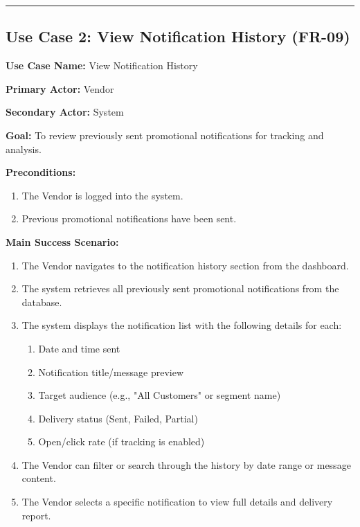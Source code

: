 \vspace{0.5cm}
\hrule
\vspace{0.5cm}

\subsection*{Use Case 2: View Notification History (FR-09)}

\textbf{Use Case Name:} View Notification History

\textbf{Primary Actor:} Vendor

\textbf{Secondary Actor:} System

\textbf{Goal:} To review previously sent promotional notifications for tracking and analysis.

\textbf{Preconditions:}
\begin{enumerate}
    \item The Vendor is logged into the system.
    \item Previous promotional notifications have been sent.
\end{enumerate}

\textbf{Main Success Scenario:}
\begin{enumerate}
    \item The Vendor navigates to the notification history section from the dashboard.
    \item The system retrieves all previously sent promotional notifications from the database.
    \item The system displays the notification list with the following details for each:
    \begin{enumerate}
        \item Date and time sent
        \item Notification title/message preview
        \item Target audience (e.g., "All Customers" or segment name)
        \item Delivery status (Sent, Failed, Partial)
        \item Open/click rate (if tracking is enabled)
    \end{enumerate}
    \item The Vendor can filter or search through the history by date range or message content.
    \item The Vendor selects a specific notification to view full details and delivery report.
\end{enumerate}

